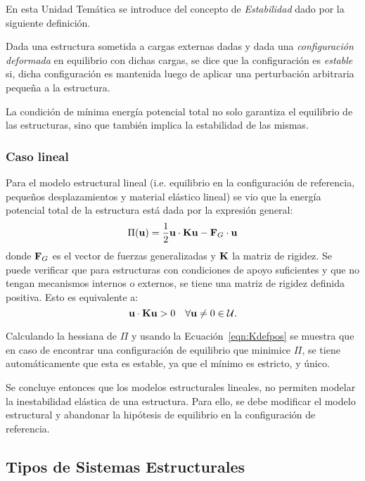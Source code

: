 En esta Unidad Temática se introduce del concepto de \textit{Estabilidad} dado por la siguiente definición.

{Dada una estructura sometida a cargas externas dadas y dada una \textit{configuración deformada} en equilibrio con dichas cargas, se dice que la configuración es \textit{estable} si, dicha configuración es mantenida luego de aplicar una perturbación arbitraria pequeña a la estructura.}

La condición de mínima energía potencial total no solo garantiza el equilibrio de las estructuras, sino que también implica la estabilidad de las mismas.

\subsubsection{Caso lineal}

Para el modelo estructural lineal (i.e. equilibrio en la configuración de referencia, pequeños desplazamientos y material elástico lineal) se vio que la energía potencial total de la estructura está dada por la expresión general:
%
\begin{equation}\label{eqn:pilineal}
\Pi({\bf u})= \frac{1}{2} {\bf u} \cdot {\bf K} {\bf u} - {\bf F}_G \cdot {\bf u}
\end{equation}
%
donde ${\bf F}_G$ es el vector de fuerzas generalizadas y ${\bf K}$ la matriz de rigidez. %
Se puede verificar que para estructuras con condiciones de apoyo suficientes y que no tengan mecanismos internos o externos, se tiene una matriz de rigidez definida positiva. Esto es equivalente a:
\begin{equation}\label{eqn:Kdefpos}
{\bf u} \cdot {\bf K} {\bf u} > 0 \quad \forall {\bf u}\neq 0 \in {\mathcal U}.
\end{equation}

Calculando la hessiana de $\Pi$ y usando la Ecuación~\ref{eqn:Kdefpos} se muestra que en caso de encontrar una configuración de equilibrio que minimice $\Pi$, se tiene automáticamente que esta es estable, ya que el mínimo es estricto, y único.  

Se concluye entonces que los modelos estructurales lineales, no permiten modelar la inestabilidad elástica de una estructura. %
%
Para ello, se debe modificar el modelo estructural y abandonar la hipótesis de equilibrio en la configuración de referencia.
 
\subsection{Tipos de Sistemas Estructurales} 


